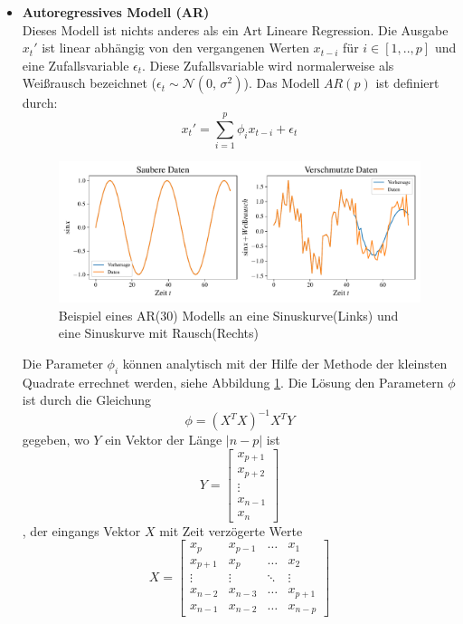 \begin{itemize}
  \item \textbf{Autoregressives Modell (AR)}\\
  Dieses Modell ist nichts anderes als ein Art Lineare Regression. Die Ausgabe $x_t'$
  ist linear abhängig von den vergangenen Werten $x_{t-i}$ für $i\in[1,..,p]$ und
  eine Zufallsvariable $\epsilon_t$. Diese Zufallsvariable wird normalerweise
  als Weißrausch bezeichnet ($\epsilon_t \sim \mathcal{N}(0,\,\sigma^{2}) $).
  Das Modell $AR(p)$ ist definiert durch:
  \[
  x_t'=\sum_{i=1}^{p}\phi_ix_{t-i}+\epsilon_t
  \] 
  \begin{figure}[h]
      \centering
      \includegraphics[width=\textwidth,keepaspectratio]{../plots/ar_sauber_verschmutze_daten.pdf}
      \caption{Beispiel eines AR(30) Modells an eine Sinuskurve(Links) und eine
      Sinuskurve mit Rausch(Rechts)}
      \label{fig:ar}
  \end{figure}
  Die Parameter $\phi_i$ können analytisch mit der Hilfe der Methode der
  kleinsten Quadrate errechnet werden, siehe Abbildung \ref{fig:ar}. Die Lösung den Parametern $\phi$ ist
  durch die Gleichung
  \[
    \phi = (X^TX)^{-1}X^TY
  \]
  gegeben, wo $Y$ ein Vektor der Länge $|n-p|$ ist 
  \[
    Y = 
    \begin{bmatrix}
    x_{p+1}\\
    x_{p+2}\\
    \vdots\\
    x_{n-1}\\
    x_{n}
    \end{bmatrix}
  \]
  , der eingangs Vektor $X$ mit Zeit verzögerte Werte 
  \[
    X = 
    \begin{bmatrix}
    x_{p}&x_{p-1}&\hdots&x_{1}\\
    x_{p+1}&x_{p}&\hdots&x_{2}\\
    \vdots&\vdots&\ddots&\vdots\\
    x_{n-2}&x_{n-3}&\hdots&x_{p+1}\\
    x_{n-1}&x_{n-2}&\hdots&x_{n-p}

\end{bmatrix}\]
\end{itemize}

